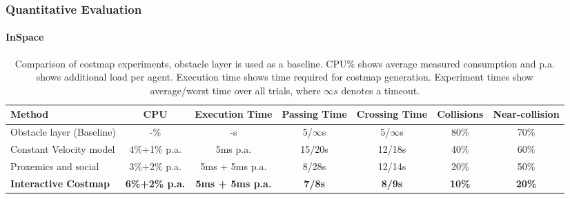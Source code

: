 \begin{frame}
	\frametitle{Quantitative Evaluation}
	\framesubtitle{InSpace}
	
	\begin{table}
	\centering
	\caption{Comparison of costmap experiments, obstacle layer is used as a baseline. CPU\% shows
			 average measured consumption and p.a. shows additional load per agent. Execution time shows
			 time required for costmap generation. Experiment times show average/worst time over all
			 trials, where $\infty s$ denotes a timeout.}
	\def\arraystretch{1.3}
	\vspace{-0.3cm}
	\resizebox{\textwidth}{!}
	{
		\begin{tabular}{lcccccc}
Method & CPU & Execution Time & Passing Time & Crossing Time & Collisions & Near-collision \\ 
\hline
Obstacle layer (Baseline) & -\% & -s & 5/$\infty$s & 5/$\infty$s & 80\% & 70\%  \\
Constant Velocity model & 4\%+1\% p.a. & 5ms p.a. & 15/20s & 12/18s & 40\% & 60\%  \\
Proxemics and social & 3\%+2\% p.a. & 5ms + 5ms p.a. & 8/28s & 12/14s & 20\% &  50\%  \\
\textbf{Interactive Costmap} & \textbf{6\%+2\% p.a.} & \textbf{5ms + 5ms p.a.} & \textbf{7/8s} & \textbf{8/9s} & \textbf{10\%} &  \textbf{20\%}  \\
		\end{tabular}
	}
\end{table}
\end{frame}


